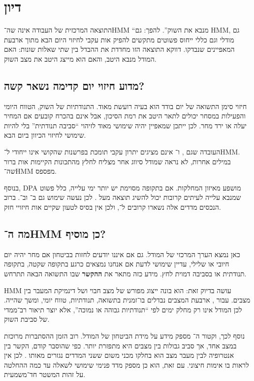 \section{דיון}

התוצאה המרכזית של העבודה אינה שה־HMM ``מנבא את השוק''. להפך: גם HMM, גם מודלי  וגם כללי ייחוס פשוטים מתקשים להפיק אות עקבי לחיזוי היום הבא מתוך ארבעת המאפיינים שנבדקו. דווקא התוצאה הזו מחדדת את ההבדל בין שתי שאלות שונות: האם המודל מנבא היטב, והאם הוא מייצג היטב את מצב השוק.

\subsection{מדוע חיזוי יום קדימה נשאר קשה?}

חיזוי סימן התשואה של יום בודד הוא בעיה רועשת מאוד. התנודתיות של השוק, הטווח היומי והפעילות במסחר יכולים לתאר היטב את רמת הסיכון, אבל אינם בהכרח קובעים אם המחיר יעלה או ירד מחר. לכן ייתכן שמאפיין יהיה שימושי מאוד לזיהוי ``סביבה תנודתית'' בלי להיות שימושי לחיזוי הכיוון ביום הבא.

העובדה שגם ,  ו־ אינם מציגים יתרון עקבי תומכת בפרשנות שהקושי אינו ייחודי ל־HMM. במילים אחרות, לא נראה שמודל סיווג אחר מצליח לחלץ מהתכונות הקיימות אות ברור שה־HMM מפספס.

בנוסף, DPA מושפע מאיזון המחלקות. אם בתקופה מסוימת יש יותר ימי עלייה, כלל פשוט שמנבא עלייה לעיתים קרובות יכול להשיג תוצאה מעל . לכן נעשה שימוש גם ב־ וב־. ברוב הנכסים מדדים אלה נשארו קרובים ל־, ולכן אין בסיס לטעון שקיים אות חיזויי חזק.

\subsection{מה ה־HMM כן מוסיף?}

כאן נמצא הערך המרכזי של המודל. גם אם איננו יודעים לחזות בביטחון אם מחר יהיה יום חיובי או שלילי, עדיין שימושי לדעת אם אנחנו נמצאים כרגע בתקופה שקטה, בתקופה תנודתית או בסביבה דמוית לחץ. מידע כזה מתאר את \textbf{ההקשר} שבו התשואה הבאה תתרחש.

HMM עושה בדיוק זאת: הוא בונה ייצוג מפורש של מצב חבוי ושל דינמיקת המעבר בין מצבים. עבור , ארבעת המצבים נבדלים בו־זמנית בתשואה, תנודתיות, טווח יומי,  ומשך שהייה. לכן המודל אינו רק מחלק ימים לפי ``תנודתיות גבוהה או נמוכה'', אלא יוצר תיאור רב־ממדי של סביבת השוק.

נוסף לכך, וקטור ה־ מספק מידע על מידת הביטחון של המודל. רוב הזמן ההסתברות מרוכזת במצב אחד, אך סביב גבולות בין מצבים היא מתפזרת יותר. כפי שהוסבר קודם, הקשר בין אנטרופיה לבין מעבר מצב הוא בחלקו מכני משום ששני המדדים נגזרים מאותו . לכן אין לראות בו אימות חיצוני. עם זאת, הוא כן מספק מדד פנימי שימושי לשאלה עד כמה ההחלטה על זהות המשטר חד־משמעית.

